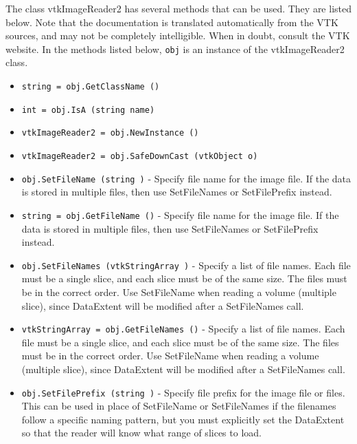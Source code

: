 The class vtkImageReader2 has several methods that can be used.
  They are listed below.
Note that the documentation is translated automatically from the VTK sources,
and may not be completely intelligible.  When in doubt, consult the VTK website.
In the methods listed below, \verb|obj| is an instance of the vtkImageReader2 class.
\begin{itemize}
\item  \verb|string = obj.GetClassName ()|

\item  \verb|int = obj.IsA (string name)|

\item  \verb|vtkImageReader2 = obj.NewInstance ()|

\item  \verb|vtkImageReader2 = obj.SafeDownCast (vtkObject o)|

\item  \verb|obj.SetFileName (string )| -  Specify file name for the image file. If the data is stored in
 multiple files, then use SetFileNames or SetFilePrefix instead.

\item  \verb|string = obj.GetFileName ()| -  Specify file name for the image file. If the data is stored in
 multiple files, then use SetFileNames or SetFilePrefix instead.

\item  \verb|obj.SetFileNames (vtkStringArray )| -  Specify a list of file names.  Each file must be a single slice,
 and each slice must be of the same size. The files must be in the
 correct order.
 Use SetFileName when reading a volume (multiple slice), since
 DataExtent will be modified after a SetFileNames call.

\item  \verb|vtkStringArray = obj.GetFileNames ()| -  Specify a list of file names.  Each file must be a single slice,
 and each slice must be of the same size. The files must be in the
 correct order.
 Use SetFileName when reading a volume (multiple slice), since
 DataExtent will be modified after a SetFileNames call.

\item  \verb|obj.SetFilePrefix (string )| -  Specify file prefix for the image file or files.  This can be
 used in place of SetFileName or SetFileNames if the filenames
 follow a specific naming pattern, but you must explicitly set
 the DataExtent so that the reader will know what range of slices
 to load.


\end{itemize}
